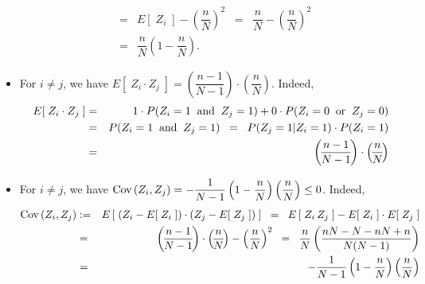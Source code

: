 \documentclass{article}
\begin{document}
\begin{itemize}
\begin{eqnarray*}
                                                      & = &  E[\;Z_{i}\;] - \left(\dfrac{n}{N}\right)^{2}
                                                      \;\; = \;\; \dfrac{n}{N} - \left(\dfrac{n}{N}\right)^{2} \\
                                                      & = & \dfrac{n}{N}\left(1 - \dfrac{n}{N}\right).
          \end{eqnarray*}
\item  For $i \neq j$, we have $E[\;Z_{i} \cdot Z_{j}\;] = \left(\!\dfrac{n-1}{N-1}\!\right)\cdot\left(\!\dfrac{n}{N}\!\right)$. \; Indeed,
          \begin{eqnarray*}
              E[\;Z_{i}\cdot Z_{j}\;] & = & 1 \cdot P(Z_{i}=1 \textnormal{\;\;and\;\;} Z_{j}=1) + 0\cdot P(Z_{i}=0 \textnormal{\;\;or\;\;} Z_{j}=0) \\
                                               & = & P(Z_{i}=1 \textnormal{\;\;and\;\;} Z_{j}=1)
                                               \;\; = \;\; P(Z_{j}=1\vert Z_{i}=1) \cdot P(Z_{i}=1) \\
                                               & = & \left(\!\dfrac{n-1}{N-1}\!\right)\cdot\left(\!\dfrac{n}{N}\!\right)
          \end{eqnarray*}
\item  For $i \neq j$, we have
          $\textnormal{Cov}\left(Z_{i},Z_{j}\right) = - \dfrac{1}{N-1}\left(1-\dfrac{n}{N}\right)\left(\dfrac{n}{N}\right) \leq 0$.
          \; Indeed,
          \begin{eqnarray*}
                         \textnormal{Cov}\left(Z_{i},Z_{j}\right)
              & := &  E\left[\;\left(Z_{i}-E[\;Z_{i}\;]\right)\cdot\left(Z_{j}-E[\;Z_{j}\;]\right)\;\right]
              \;\;=\;\;  E\left[\;Z_{i}\,Z_{j}\;\right] - E[\;Z_{i}\;]\cdot E[\;Z_{j}\;] \\
              &  = &  \left(\!\dfrac{n-1}{N-1}\!\right)\cdot\left(\!\dfrac{n}{N}\!\right) - \left(\dfrac{n}{N}\right)^{2}
              \;\;=\;\;  \dfrac{n}{N}\left(\dfrac{nN - N - nN + n}{N(N-1)}\right) \\
              & = &  - \dfrac{1}{N-1}\left(1-\dfrac{n}{N}\right)\left(\dfrac{n}{N}\right)
          \end{eqnarray*}
\end{itemize}
\end{document}
